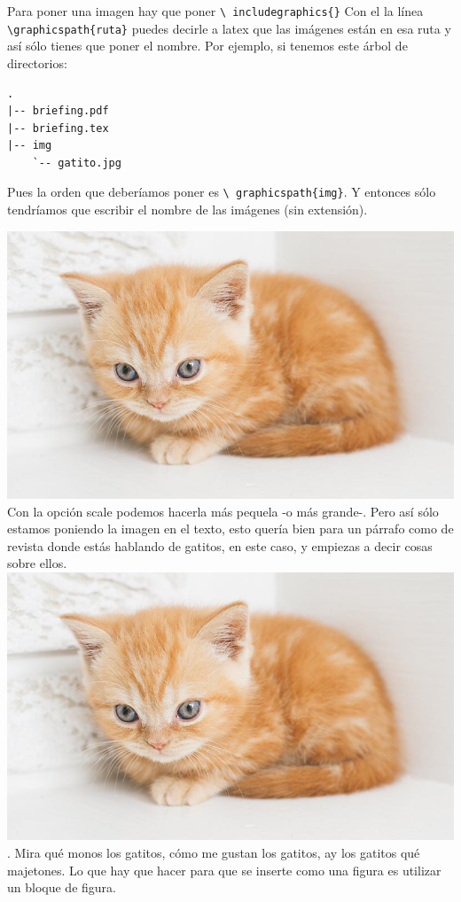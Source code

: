 \documentclass{article}
\begin{document}
Para poner una imagen hay que poner \texttt{\textbackslash
includegraphics\{<ruta a la imagen, puede ser relativa>\}}
Con el la línea \texttt{\textbackslash graphicspath\{ruta\}}
puedes decirle a latex que las imágenes están en esa ruta y así sólo tienes
que poner el nombre. Por ejemplo, si tenemos este árbol de directorios:

\begin{verbatim}
.
|-- briefing.pdf
|-- briefing.tex
|-- img
    `-- gatito.jpg
\end{verbatim}

Pues la orden que deberíamos poner es \texttt{\textbackslash
graphicspath\{img\}}. Y entonces sólo tendríamos que escribir el nombre de las
imágenes (sin extensión).

\includegraphics{./img/gatito}
Con la opción scale podemos hacerla más pequela -o más grande-.
Pero así sólo estamos poniendo la imagen en el texto, esto quería bien para un
párrafo como de revista donde estás hablando de gatitos, en este caso, y
empiezas a decir cosas sobre ellos.\includegraphics[scale=0.2]{./img/gatito}.
Mira qué monos los gatitos, cómo me gustan los gatitos, ay los gatitos qué
majetones. Lo que hay que hacer para que se inserte como una figura es utilizar
un bloque de figura.
\end{document}

